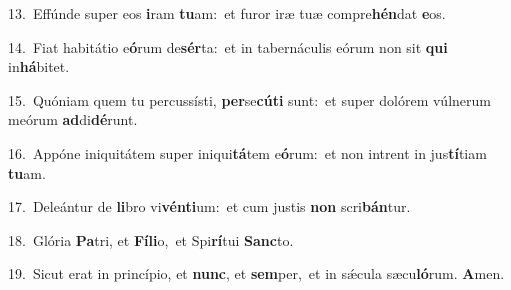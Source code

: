 {\numbfont\textcolor{\numbcolor}{13.}}~Effúnde super eos \textbf{i}\-ram \textbf{tu}\-am:~\star et furor iræ tuæ compre\-\textbf{hén}\-dat \textbf{e}\-os.\par
{\numbfont\textcolor{\numbcolor}{14.}}~Fiat habitátio e\-\textbf{ó}\-rum de\-\textbf{sér}\-ta:~\star et in tabernáculis eórum non sit \textbf{qui} in\-\textbf{há}\-bitet.\par
{\numbfont\textcolor{\numbcolor}{15.}}~Quóniam quem tu percussísti, \textbf{per}\-se\-\textbf{cú}\-\textbf{ti} sunt:~\star et super dolórem vúlnerum meórum \textbf{ad}\-di\-\textbf{dé}\-runt.\par
{\numbfont\textcolor{\numbcolor}{16.}}~Appóne iniquitátem super iniqui\-\textbf{tá}\-tem e\-\textbf{ó}\-rum:~\star et non intrent in jus\-\textbf{tí}\-tiam \textbf{tu}\-am.\par
{\numbfont\textcolor{\numbcolor}{17.}}~Deleántur de \textbf{li}\-bro vi\-\textbf{vén}\-\textbf{ti}um:~\star et cum justis \textbf{non} scri\-\textbf{bán}\-tur.\par
{\numbfont\textcolor{\numbcolor}{18.}}~Glória \textbf{Pa}\-tri, et \textbf{Fí}\-\textbf{li}o,~\star et Spi\-\textbf{rí}\-tui \textbf{Sanc}\-to.\par
{\numbfont\textcolor{\numbcolor}{19.}}~Sicut erat in princípio, et \textbf{nunc}\-, et \textbf{sem}\-per,~\star et in sǽcula sæcu\-\textbf{ló}\-rum. \textbf{A}\-men.\par
